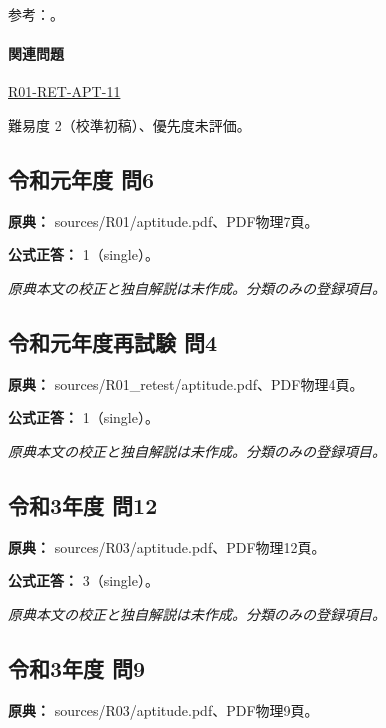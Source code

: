 \par 参考：\cite{env_offset2008,env_development,env_zero2008,env_accumulation}。

\paragraph{関連問題} \hyperref[q:r01-ret-apt-11]{R01-RET-APT-11}

\par 難易度 2（校準初稿）、優先度未評価。

\subsection{令和元年度 問6}
\label{q:r01-reg-apt-06}

\noindent\textbf{原典：} sources/R01/aptitude.pdf、PDF物理7頁。

\textbf{公式正答：} 1（single）。

\par\textit{原典本文の校正と独自解説は未作成。分類のみの登録項目。}

\subsection{令和元年度再試験 問4}
\label{q:r01-ret-apt-04}

\noindent\textbf{原典：} sources/R01\_retest/aptitude.pdf、PDF物理4頁。

\textbf{公式正答：} 1（single）。

\par\textit{原典本文の校正と独自解説は未作成。分類のみの登録項目。}

\subsection{令和3年度 問12}
\label{q:r03-reg-apt-12}

\noindent\textbf{原典：} sources/R03/aptitude.pdf、PDF物理12頁。

\textbf{公式正答：} 3（single）。

\par\textit{原典本文の校正と独自解説は未作成。分類のみの登録項目。}

\subsection{令和3年度 問9}
\label{q:r03-reg-apt-09}

\noindent\textbf{原典：} sources/R03/aptitude.pdf、PDF物理9頁。

